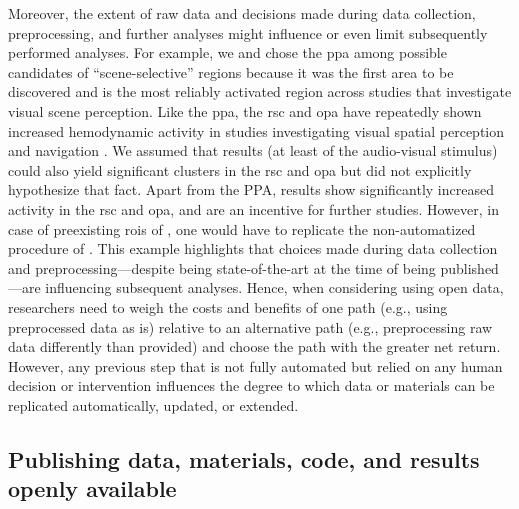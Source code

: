 %
Moreover, the extent of raw data and decisions made during data collection,
preprocessing, and further analyses might influence or even limit subsequently
performed analyses.
%
For example, we and \citet{sengupta2016extension} chose the \ac{ppa} among
possible candidates of ``scene-selective'' regions because it was the first area
to be discovered and is the most reliably activated region across studies that
investigate visual scene perception.
%
Like the \ac{ppa}, the \ac{rsc} and \ac{opa} have repeatedly shown increased
hemodynamic activity in studies investigating visual spatial perception and
navigation \citep{chrastil2018heterogeneity, bettencourt2013role,
dilks2013occipital, epstein2019scene}.
%
We assumed that results (at least of the audio-visual stimulus) could also yield
significant clusters in the \ac{rsc} and \ac{opa} but did not explicitly
hypothesize that fact.
%
Apart from the PPA, results show significantly increased activity in the
\ac{rsc} and \ac{opa}, and are an incentive for further studies.
However, in case of preexisting \acp{roi} of \citep{sengupta2016extension}, one
would have to replicate the non-automatized procedure of
\citep{sengupta2016extension}.
%
This example highlights that choices made during data collection and
preprocessing---despite being state-of-the-art at the time of being
published---are influencing subsequent analyses.
Hence, when considering using open data, researchers need to weigh the costs and
benefits of one path (e.g., using preprocessed data as is) relative to an
alternative path (e.g., preprocessing raw data differently than provided) and
choose the path with the greater net return.
%
However, any previous step that is not fully automated but relied on any human
decision or intervention influences the degree to which data or materials can be
replicated automatically, updated, or extended.


\subsection{Publishing data, materials, code, and results openly available}



%

